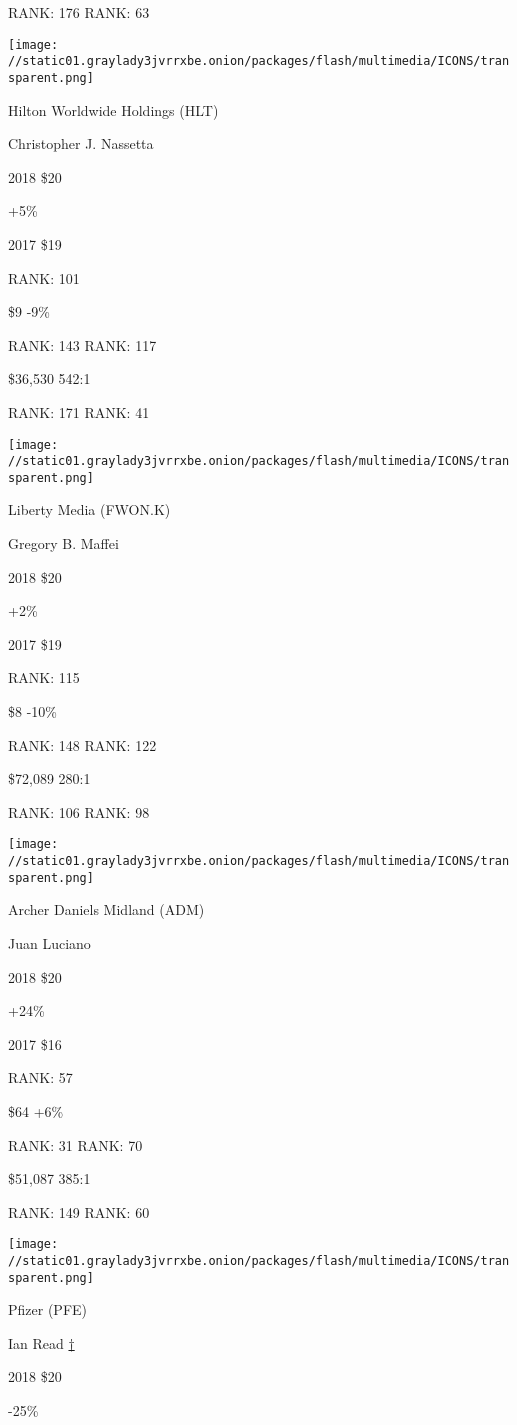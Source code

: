 RANK: 176 RANK: 63

\texttt{[image: //static01.graylady3jvrrxbe.onion/packages/flash/multimedia/ICONS/transparent.png]}

Hilton Worldwide Holdings (HLT)

Christopher J. Nassetta \protect\hyperlink{g-footnotes}{}

2018 \$20

 +5\%

2017 \$19

RANK: 101

 \$9 -9\%

RANK: 143 RANK: 117

 \$36,530 542:1

RANK: 171 RANK: 41

\texttt{[image: //static01.graylady3jvrrxbe.onion/packages/flash/multimedia/ICONS/transparent.png]}

Liberty Media (FWON.K)

Gregory B. Maffei \protect\hyperlink{g-footnotes}{}

2018 \$20

 +2\%

2017 \$19

RANK: 115

 \$8 -10\%

RANK: 148 RANK: 122

 \$72,089 280:1

RANK: 106 RANK: 98

\texttt{[image: //static01.graylady3jvrrxbe.onion/packages/flash/multimedia/ICONS/transparent.png]}

Archer Daniels Midland (ADM)

Juan Luciano \protect\hyperlink{g-footnotes}{}

2018 \$20

 +24\%

2017 \$16

RANK: 57

 \$64 +6\%

RANK: 31 RANK: 70

 \$51,087 385:1

RANK: 149 RANK: 60

\texttt{[image: //static01.graylady3jvrrxbe.onion/packages/flash/multimedia/ICONS/transparent.png]}

Pfizer (PFE)

Ian Read \protect\hyperlink{g-footnotes}{†}

2018 \$20

 -25\%

